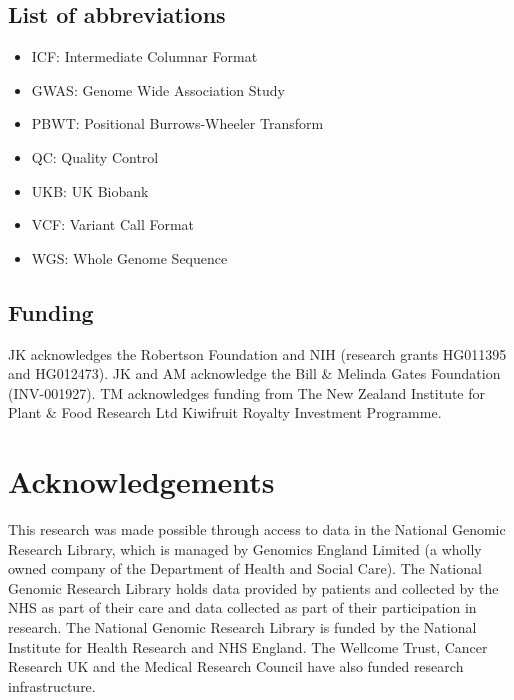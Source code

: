 \documentclass[a4paper,num-refs]{oup-contemporary}
\begin{document}
\subsection{List of abbreviations}

\begin{itemize}
    \item ICF: Intermediate Columnar Format
    \item GWAS: Genome Wide Association Study
    \item PBWT: Positional Burrows-Wheeler Transform
    \item QC: Quality Control
    \item UKB: UK Biobank
    \item VCF: Variant Call Format
    \item WGS: Whole Genome Sequence
\end{itemize}

\subsection{Funding}
JK acknowledges the Robertson Foundation and 
NIH (research grants HG011395 and HG012473). 
JK and AM acknowledge the Bill \& Melinda Gates Foundation (INV-001927).
TM acknowledges funding from The New Zealand Institute for Plant \& Food
Research Ltd Kiwifruit Royalty Investment Programme.


\section{Acknowledgements}
This research was made possible through access to data in the National Genomic
Research Library, which is managed by Genomics England Limited (a wholly owned
company of the Department of Health and Social Care). The National Genomic
Research Library holds data provided by patients and collected by the NHS as
part of their care and data collected as part of their participation in
research. The National Genomic Research Library is funded by the National
Institute for Health Research and NHS England. The Wellcome Trust, Cancer
Research UK and the Medical Research Council have also funded research
infrastructure.
\end{document}

